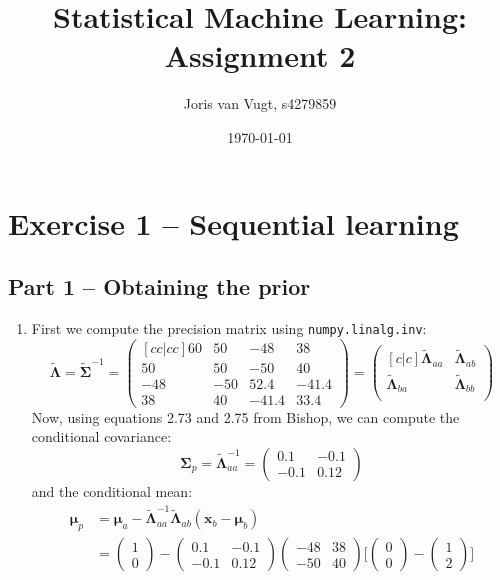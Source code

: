\documentclass{article}
\title{Statistical Machine Learning: Assignment 2}
\date{\today}
\author{Joris van Vugt, s4279859}
\begin{document}
\maketitle
\section*{Exercise 1 -- Sequential learning}
\subsection*{Part 1 -- Obtaining the prior}
\begin{enumerate}
\item 
First we compute the precision matrix using \texttt{numpy.linalg.inv}:
$$
\tilde{\bm{\Lambda}} = \tilde{\bm{\Sigma}}^{-1} = 
\begin{pmatrix}[c c | c c]
60 & 50 & -48 & 38 \\
50 & 50 & -50 & 40 \\ \hline
-48 & -50 & 52.4 & -41.4 \\
38 & 40 & -41.4 & 33.4
\end{pmatrix} = 
\begin{pmatrix}[c | c]
\tilde{\bm{\Lambda}}_{aa} & \tilde{\bm{\Lambda}}_{ab} \\
\hline
\tilde{\bm{\Lambda}}_{ba} & \tilde{\bm{\Lambda}}_{bb} \\
\end{pmatrix}
$$
Now, using equations 2.73 and 2.75 from Bishop, we can compute the conditional covariance:
$$
\bm{\Sigma}_p = \tilde{\bm{\Lambda}}_{aa}^{-1} = 
\begin{pmatrix}
0.1 & -0.1 \\
-0.1 & 0.12
\end{pmatrix}
$$
and the conditional mean:
\begin{align*}
\bm{\mu}_p &= \bm{\mu}_a - \tilde{\bm{\Lambda}}_{aa}^{-1} \tilde{\bm{\Lambda}}_{ab}(\bm{x}_b - \bm{\mu}_b) \\
&= \begin{pmatrix}1 \\ 0 \end{pmatrix} - 
\begin{pmatrix}
0.1 & -0.1 \\
-0.1 & 0.12
\end{pmatrix}
\begin{pmatrix}
-48 & 38 \\
-50 & 40
\end{pmatrix}
\Bigg[\begin{pmatrix}0 \\ 0\end{pmatrix} - \begin{pmatrix}1 \\ 2\end{pmatrix}\Bigg] \\

\end{align*}
\end{enumerate}
\end{document}
